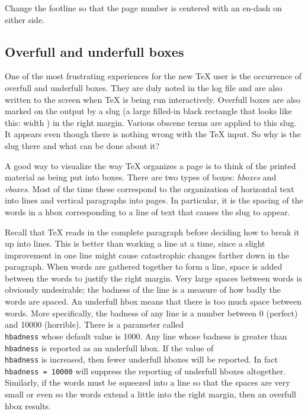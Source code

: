 \exercise Change the footline so that the page number is centered{} 
with an en-dash on either side. 

\subsection{Overfull and underfull boxes} 

One of the most frustrating experiences for the new \TeX{} user 
is the occurrence of overfull and underfull boxes.  They are duly 
noted in the log file and are also written to the screen when \TeX{} 
is being run interactively.  Overfull boxes are also marked 
on the output by a slug (a large filled-in black rectangle that 
looks like this: \vrule width \overfullrule) in the right 
margin. Various obscene terms are applied to this slug.  It 
appears even though there is nothing wrong with the \TeX{} input. 
So why is the slug there and what can be done about it? 

A good way to visualize the way \TeX{} organizes a page is to 
think of the printed material as being put into boxes. There are 
two types of boxes: {\sl hboxes\/} and {\sl vboxes}.  Most of the 
time these correspond to the organization of horizontal text 
into lines and vertical paragraphs into pages.  In particular, it 
is the spacing of the words in a hbox corresponding to a line of 
text that causes the slug to appear. 

Recall that \TeX{} reads in the complete paragraph before 
deciding how to break it up into lines.  This is better than 
working a line at a time, since a slight improvement in one line 
might cause catastrophic changes farther down in the paragraph. 
When words are gathered together to form a line, space is added 
between the words to justify the right margin. Very large spaces 
between words is obviously undesirable; the badness of the line 
is a measure of how badly the words are spaced.  An underfull 
hbox means that there is too much space between words.  More 
specifically, the badness of any line is a number between 0 
(perfect) and 10000 (horrible).  There is a parameter called {\tt 
\\hbadness} whose default value is 1000\null.  Any line whose 
badness is greater than {\tt \\hbadness} is reported as an 
underfull hbox.  If the value of {\tt \\hbadness} is increased, 
then fewer underfull hboxes will be reported. In fact {\tt 
\\hbadness = 10000} will suppress the reporting of underfull 
hboxes altogether. Similarly, if the words must be squeezed into 
a line so that the spaces are very small or even so the words 
extend a little into the right margin, then an overfull hbox 
results.  

